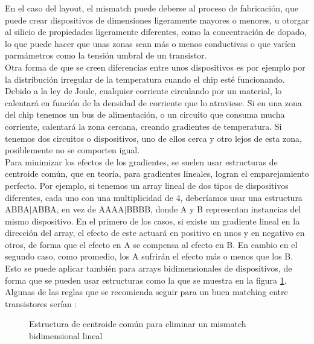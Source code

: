 En el caso del layout, el mismatch puede deberse al proceso de fabricación,
que puede crear dispositivos de dimensiones ligeramente mayores o menores,
u otorgar al silicio de propiedades ligeramente diferentes, como la concentración de
dopado, lo que puede hacer que unas zonas sean más o menos conductivas o que varíen
parmámetros como la tensión umbral de un transistor.\\

Otra forma de que se creen diferencias entre unos dispositivos
es por ejemplo por la distribución irregular
de la temperatura cuando el chip esté funcionando. Debido a la ley de Joule, cualquier
corriente circulando por un material, lo calentará en función de la densidad de corriente
que lo atraviese. Si en una zona del chip tenemos un bus de alimentación, o un circuito
que consuma mucha corriente, calentará la zona cercana, creando gradientes de temperatura.
Si tenemos dos circuitos o dispositivos, uno de ellos cerca y otro lejos de esta zona,
posiblemente no se comporten igual.\\

Para minimizar los efectos de los gradientes, se suelen usar estructuras
de centroide común, que en teoría, para gradientes lineales, logran el emparejamiento
perfecto. Por ejemplo, si tenemos un array lineal de dos tipos de dispositivos diferentes,
cada uno con una multiplicidad de 4, deberíamos usar una estructura ABBA$\vert $ABBA, en vez
de AAAA$\vert $BBBB, donde A y B representan instancias del mismo dispositivo. En el primero
de los casos, si existe un gradiente lineal en la dirección del array, el efecto de este
actuará en positivo en unos y en negativo en otros, de forma que el efecto en A se compensa
al efecto en B. En cambio en el segundo caso, como promedio, los A sufrirán el efecto
más o menos que los B.\\

Esto se puede aplicar también para arrays bidimensionales de dispositivos,
de forma que se pueden usar estructuras como la que se muestra en la figura \ref{fig:centroide_comun}.
Algunas de las reglas que se recomienda seguir para un buen matching entre transistores
serían \cite{Hastings2001}:\\

\begin{figure}[h]
	\centering
	
	\caption{Estructura de centroide común para eliminar un mismatch bidimensional lineal}
	\label{fig:centroide_comun}
\end{figure}


